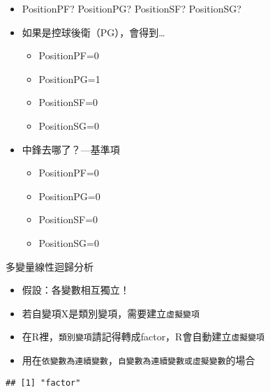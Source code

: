 \documentclass[]{book}
\newenvironment{Shaded}{\begin{snugshade}}{\end{snugshade}}
\newcommand{\KeywordTok}[1]{\textcolor[rgb]{0.13,0.29,0.53}{\textbf{{#1}}}}
\newcommand{\NormalTok}[1]{{#1}}
\providecommand{\tightlist}{%
  \setlength{\itemsep}{0pt}\setlength{\parskip}{0pt}}
\begin{document}
\begin{itemize}
\tightlist
\item
  PositionPF? PositionPG? PositionSF? PositionSG?
\item
  如果是控球後衛（PG），會得到\ldots{}

  \begin{itemize}
  \tightlist
  \item
    PositionPF=0
  \item
    PositionPG=1
  \item
    PositionSF=0
  \item
    PositionSG=0
  \end{itemize}
\item
  中鋒去哪了？---基準項

  \begin{itemize}
  \tightlist
  \item
    PositionPF=0
  \item
    PositionPG=0
  \item
    PositionSF=0
  \item
    PositionSG=0
  \end{itemize}
\end{itemize}

多變量線性迴歸分析

\begin{itemize}
\tightlist
\item
  假設：各變數相互獨立！
\item
  若自變項X是類別變項，需要建立\texttt{虛擬變項}
\item
  在R裡，\texttt{類別變項}請記得轉成factor，R會自動建立\texttt{虛擬變項}
\item
  用在\texttt{依變數為連續變數}，\texttt{自變數為連續變數或虛擬變數}的場合
\end{itemize}

\begin{Shaded}
\end{Shaded}

\begin{verbatim}
## [1] "factor"
\end{verbatim}

\begin{Shaded}
\end{Shaded}
\end{document}
